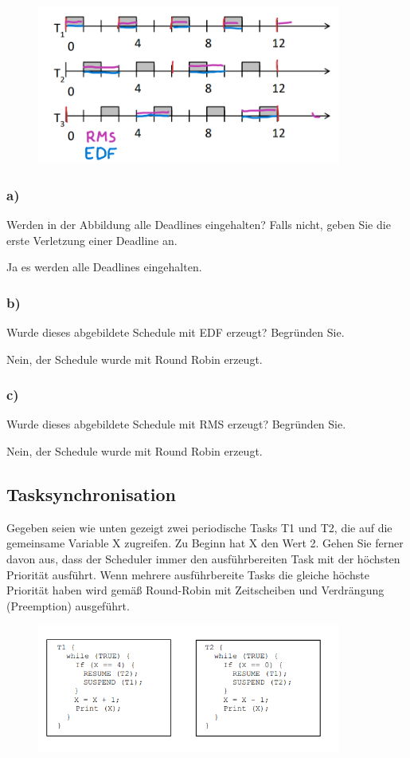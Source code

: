 \begin{figure}[H]
  \includegraphics[width=10cm]{images/KA140421/3a.PNG}
  \centering
\end{figure}

\subsubsection{a)}
Werden in der Abbildung alle Deadlines eingehalten? Falls nicht, geben Sie die erste Verletzung
einer Deadline an.

Ja es werden alle Deadlines eingehalten.

\subsubsection{b)}
Wurde dieses abgebildete Schedule mit EDF erzeugt? Begründen Sie.

Nein, der Schedule wurde mit Round Robin erzeugt.

\subsubsection{c)}
Wurde dieses abgebildete Schedule mit RMS erzeugt? Begründen Sie.

Nein, der Schedule wurde mit Round Robin erzeugt.

\subsection{Tasksynchronisation}
Gegeben seien wie unten gezeigt zwei periodische Tasks T1 und T2, die auf die gemeinsame Variable X
zugreifen. Zu Beginn hat X den Wert 2. Gehen Sie ferner davon aus, dass der Scheduler immer den
ausführbereiten Task mit der höchsten Priorität ausführt. Wenn mehrere ausführbereite Tasks die gleiche
höchste Priorität haben wird gemäß Round-Robin mit Zeitscheiben und Verdrängung (Preemption)
ausgeführt.

\begin{figure}[H]
  \includegraphics[width=10cm]{images/KA140421/4a.PNG}
  \centering
\end{figure}

